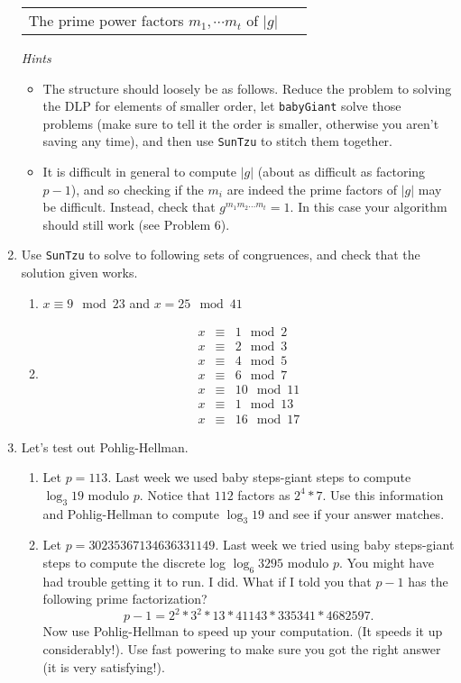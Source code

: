\documentclass[11pt]{article}
\begin{document}
\begin{enumerate}
{\begin{center}
\begin{tabular}{c|c}
      The prime power factors $m_1,\cdots m_t$ of $|g|$ & \
    \end{tabular}
  \end{center}
  \textit{Hints}
  \begin{itemize}
    \item{
    The structure should loosely be as follows.  Reduce the problem to solving the DLP for elements of smaller order, let \verb|babyGiant| solve those problems (make sure to tell it the order is smaller, otherwise you aren't saving any time), and then use \verb|SunTzu| to stitch them together.
    }
    \item{
    It is difficult in general to compute $|g|$ (about as difficult as factoring $p-1$), and so checking if the $m_i$ are indeed the prime factors of $|g|$ may be difficult.  Instead, check that $g^{m_1m_2...m_t} = 1$.  In this case your algorithm should still work (see Problem 6).
    }
  \end{itemize}
  }
  \item{
  Use \verb|SunTzu| to solve to following sets of congruences, and check that the solution given works.
  \begin{enumerate}
    \item{
      $x \equiv 9\mod 23$ and $x = 25\mod 41$
    }
    \item{
    \begin{eqnarray*}
      x&\equiv& 1\mod2\\
      x&\equiv& 2\mod3\\
      x&\equiv& 4\mod5\\
      x&\equiv& 6\mod7\\
      x&\equiv& 10\mod 11\\
      x&\equiv& 1\mod 13\\
      x&\equiv& 16\mod 17
    \end{eqnarray*}
    }
  \end{enumerate}
  }
  \item{
  Let's test out Pohlig-Hellman.
  \begin{enumerate}
    \item{
    Let $p = 113$.  Last week we used baby steps-giant steps to compute $\log_3 19$ modulo $p$.  Notice that $112$ factors as $2^4*7$.  Use this information and Pohlig-Hellman to compute $\log_3 19$ and see if your answer matches.
    }
    \item{
    Let $p = 30235367134636331149$.  Last week we tried using baby steps-giant steps to compute the discrete log $\log_6 3295$ modulo $p$.  You might have had trouble getting it to run.  I did.  What if I told you that $p-1$ has the following prime factorization?
    \[p-1 = 2^2 * 3^2 * 13 * 41143 * 335341 * 4682597.\]
    Now use Pohlig-Hellman to speed up your computation.  (It speeds it up considerably!).  Use fast powering to make sure you got the right answer (it is very satisfying!).
    }
  \end{enumerate}
  }
  \end{enumerate}
\end{document}
